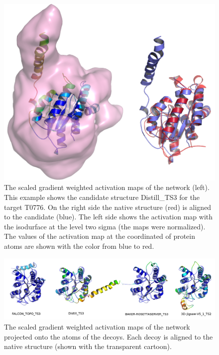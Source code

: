 \begin{figure}[H]
    \centering
    \includegraphics[width=\linewidth]{Fig/FigT0776.png}
    \caption{The scaled gradient weighted activation maps of the network (left). 
    This example shows the candidate structure Distill\_TS3 for 
    the target T0776. On the right side the native structure (red) is aligned to the candidate (blue). The left side shows the activation 
    map with the isodurface at the level two sigma (the maps were normalized). The values of the activation map at the coordinated of protein
    atoms are shown with the color from blue to red.}
    \label{Fig:GradCAMT0776}
\end{figure}

\begin{figure}[H]
    \centering
    \includegraphics[width=\linewidth]{Fig/T0776.png}
    \caption{The scaled gradient weighted activation maps of the network projected onto the atoms of the decoys. 
    Each decoy is aligned to the native structure (shown with the transparent cartoon).}
    \label{Fig:GradCAMT0776_more}
\end{figure}

